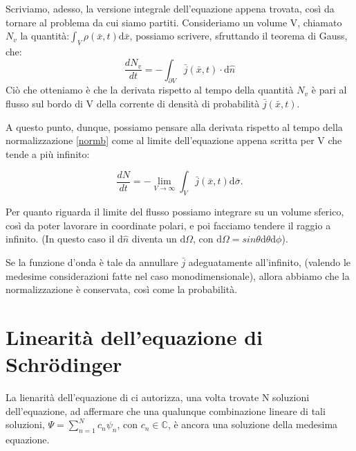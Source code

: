 Scriviamo, adesso, la versione integrale dell'equazione appena trovata, così da tornare al problema da cui siamo partiti.
Consideriamo un volume V, chiamato $N_v$ la quantità:$\int_{V}^{}{\rho \left(\bar x,t\right) \textrm{d}\bar x}$, possiamo scrivere, sfruttando il teorema di Gauss, che:
\begin{equation}
\frac{dN_v}{dt}=-\int_{\partial V}^{}{\bar j\left(\bar x,t\right)\cdot \textrm{d}\hat{n} }
\end{equation}
Ciò che otteniamo è che la derivata rispetto al tempo della quantità $N_v$ è pari al flusso sul bordo di V della corrente di densità di probabilità $\bar j(\bar x,t)$.

A questo punto, dunque, possiamo pensare alla derivata rispetto al tempo della normalizzazione \eqref{normb} come al limite dell'equazione appena scritta per V che tende a più infinito:

\begin{equation}
\frac{dN}{dt}=-\lim_{V\to \infty}{\int_{V}^{}{\bar j\left(\bar x,t\right) \textrm{d}\bar \sigma }}.
\end{equation}

Per quanto riguarda il limite del flusso possiamo integrare su un volume sferico, così da poter lavorare in coordinate polari, e poi facciamo tendere il raggio a infinito. (In questo caso il $\textrm{d}\hat{n}$ diventa un $\textrm{d}\Omega$, con $\textrm{d}\Omega=sin\theta\textrm{d}\theta \textrm{d}\phi$).

Se la funzione d'onda è tale da annullare $\bar j$ adeguatamente all'infinito, (valendo le medesime considerazioni fatte nel caso monodimensionale),  allora abbiamo che la normalizzazione è conservata, così come la probabilità.


\section[Linearità dell'equazione]{Linearità dell'equazione di Schrödinger} %
La lienarità dell'equazione di \sch ci autorizza, una volta trovate N soluzioni dell'equazione, ad affermare che una qualunque combinazione lineare di tali soluzioni, $\Psi=\sum_{n=1}^{N}c_n\psi_n$, con $c_n \in \mathbb{C}$, è ancora una soluzione della medesima equazione.

